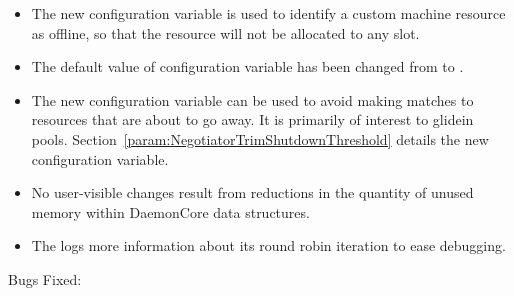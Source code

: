 \begin{itemize}
\item The new configuration variable 
is used to identify a custom machine resource as offline,
so that the resource will not be allocated to any slot.

\item The default value of configuration variable 
 has been changed from 
 to .

\item The new configuration variable 
 can be used to avoid 
making matches to resources that are about to go away. 
It is primarily of interest to glidein pools.  
Section~\ref{param:NegotiatorTrimShutdownThreshold} details the new
configuration variable.

\item No user-visible changes result from reductions in the quantity of
unused memory within DaemonCore data structures.

\item The  logs more information about its round robin
iteration to ease debugging.

\end{itemize}

\noindent Bugs Fixed:

